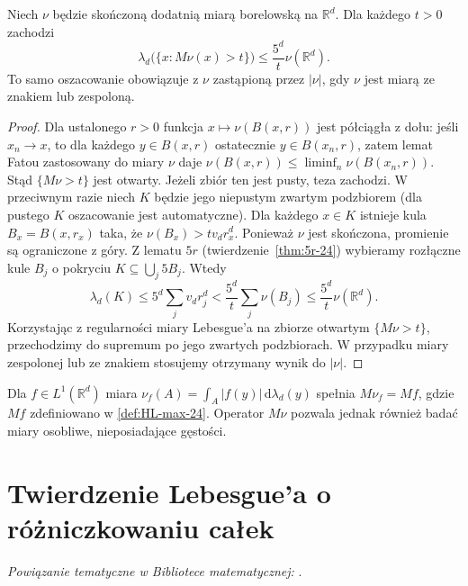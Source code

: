 \begin{twierdzenie}
\label{thm:weak-measure-25}
Niech $\nu$ będzie skończoną dodatnią miarą borelowską
na $\mathbb R^d$. Dla każdego $t>0$ zachodzi
\begin{equation}\label{eq:weak-measure-25}
 \lambda_d\bigl(\{x:M\nu(x)>t\}\bigr)
 \le \frac{5^d}{t}\nu(\mathbb R^d).
\end{equation}
To samo oszacowanie obowiązuje z $\nu$ zastąpioną przez
$|\nu|$, gdy $\nu$ jest miarą ze znakiem lub zespoloną.
\end{twierdzenie}
\begin{proof}
Dla ustalonego $r>0$ funkcja $x\mapsto\nu(B(x,r))$
jest półciągła z dołu: jeśli $x_n\to x$, to dla każdego
$y\in B(x,r)$ ostatecznie $y\in B(x_n,r)$, zatem lemat
Fatou zastosowany do miary $\nu$ daje
$\nu(B(x,r))\le\liminf_n\nu(B(x_n,r))$. Stąd
$\{M\nu>t\}$ jest otwarty. Jeżeli zbiór ten jest pusty, teza zachodzi. W przeciwnym
razie niech $K$ będzie jego niepustym zwartym podzbiorem
(dla pustego $K$ oszacowanie jest automatyczne). Dla każdego $x\in K$ istnieje
kula $B_x=B(x,r_x)$ taka, że
$\nu(B_x)>tv_dr_x^d$. Ponieważ $\nu$ jest skończona,
promienie są ograniczone z góry. Z lematu $5r$
(twierdzenie~\ref{thm:5r-24}) wybieramy rozłączne
kule $B_j$ o pokryciu $K\subseteq\bigcup_j5B_j$.
Wtedy
\[
\lambda_d(K)\le5^d\sum_jv_dr_j^d
 <\frac{5^d}{t}\sum_j\nu(B_j)
 \le\frac{5^d}{t}\nu(\mathbb R^d).
\]
Korzystając z regularności miary Lebesgue'a na zbiorze
otwartym $\{M\nu>t\}$, przechodzimy do supremum po
jego zwartych podzbiorach. W przypadku miary zespolonej
lub ze znakiem stosujemy otrzymany wynik do $|\nu|$.
\end{proof}

\begin{uwaga}
Dla $f\in L^1(\mathbb R^d)$ miara
$\nu_f(A)=\int_A|f(y)|\,\mathrm d\lambda_d(y)$ spełnia
$M\nu_f=Mf$, gdzie $Mf$ zdefiniowano w
\ref{def:HL-max-24}. Operator $M\nu$ pozwala jednak
również badać miary osobliwe, nieposiadające gęstości.
\end{uwaga}

\section{Twierdzenie Lebesgue'a o różniczkowaniu całek}

\noindent\emph{Powiązanie tematyczne w Bibliotece matematycznej:} .

